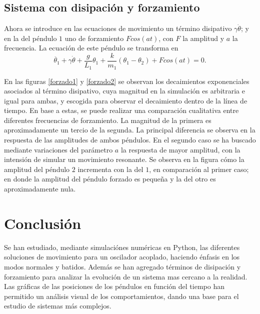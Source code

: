 \documentclass[%
 aip,
rsi,%
 amsmath,amssymb,
 reprint,%
]{revtex4-1}
\begin{document}
\subsection{Sistema con disipaci\'on y forzamiento}

Ahora se introduce en las ecuaciones de movimiento un t\'ermino disipativo $\gamma \dot{\theta}$; y en la del p\'endulo $1$ uno de forzamiento $Fcos(at)$\cite{forzamiento}, con $F$ la amplitud y $a$ la frecuencia. La ecuaci\'on de este p\'endulo se transforma en
\begin{equation}
\ddot{\theta_1}+\gamma\dot{\theta}+\frac{g}{L_1}\theta_1+\frac{k}{m_1}(\theta_1-\theta_2)+Fcos(at)=0.
\end{equation}

En las figuras \ref{forzado1} y \ref{forzado2} se observan los decaimientos exponenciales asociados al t\'ermino disipativo, cuya magnitud en la simulaci\'on es arbitraria e igual para ambas, y escogida para observar el decaimiento dentro de la l\'inea de tiempo. En base a estas, se puede realizar una comparaci\'on cualitativa entre diferentes frecuencias de forzamiento. La magnitud de la primera es aproximadamente un tercio de la segunda. La principal diferencia se observa en la respuesta de las amplitudes de ambos p\'endulos. En el segundo caso se ha buscado mediante variaciones del par\'ametro $a$ la respuesta de mayor amplitud, con la intensi\'on de simular un movimiento resonante. Se observa en la figura c\'omo la amplitud del p\'endulo $2$ incrementa con la del $1$, en comparaci\'on al primer caso; en donde la amplitud del p\'endulo forzado es peque\~na y la del otro es aproximadamente nula.

  \begin{figure}
\end{figure}


\section{Conclusi\'on}
Se han estudiado, mediante simulaci\'ones num\'ericas en Python, las diferentes soluciones de movimiento para un oscilador acoplado, haciendo \'enfasis en los modos normales y batidos. Adem\'as se han agregado t\'erminos de disipaci\'on y forzamiento para analizar la evoluci\'on de un sistema mas cercano a la realidad. Las gr\'aficas de las posiciones de los p\'endulos en funci\'on del tiempo han permitido un an\'alisis visual de los comportamientos, dando una base para el estudio de sistemas m\'as complejos.
\end{document}

